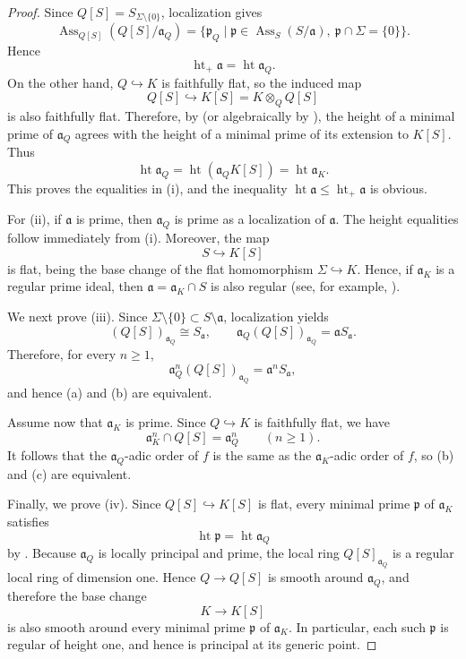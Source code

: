 \documentclass[a4paper]{amsart}
\renewcommand{\a}{{\mathfrak{a}}}
\theoremstyle{definition}
\begin{document}
\begin{proof}
Since $Q[S]=S_{\Sigma\setminus\{0\}}$, localization gives
\[
\operatorname{Ass}_{Q[S]}(Q[S]/\mathfrak a_Q)
=
\bigl\{
\mathfrak p_Q
\;\big|\;
\mathfrak p\in \operatorname{Ass}_S(S/\mathfrak a),\ 
\mathfrak p\cap\Sigma=\{0\}
\bigr\}.
\]
Hence
\[
\operatorname{ht}_+\mathfrak a=\operatorname{ht}\mathfrak a_Q.
\]
On the other hand, $Q\hookrightarrow K$ is faithfully flat, so the induced map
\[
Q[S]\hookrightarrow K[S]=K\otimes_Q Q[S]
\]
is also faithfully flat. Therefore, by \cite[III, Corollary 9.6]{ha}
(or algebraically by \cite[Theorem 15.1]{mats}),
the height of a minimal prime of $\mathfrak a_Q$ agrees with the height of a
minimal prime of its extension to $K[S]$. Thus
\[
\operatorname{ht}\mathfrak a_Q
=
\operatorname{ht}(\mathfrak a_QK[S])
=
\operatorname{ht}\mathfrak a_K.
\]
This proves the equalities in {\rm (i)}, and the inequality
$\operatorname{ht}\mathfrak a\le \operatorname{ht}_+\mathfrak a$ is obvious.

For {\rm (ii)}, if $\mathfrak a$ is prime, then $\mathfrak a_Q$ is prime as a
localization of $\mathfrak a$.
The height equalities follow immediately from {\rm (i)}.
Moreover, the map
\[
S\hookrightarrow K[S]
\]
is flat, being the base change of the flat homomorphism $\Sigma\hookrightarrow K$.
Hence, if $\a_K$ is a regular prime ideal, then
$\a=\a_K\cap S$ is also regular
(see, for example, \cite[Theorem 15.1(ii)]{mats}).

We next prove {\rm (iii)}.
Since $\Sigma\setminus\{0\}\subset S\setminus \a$, localization yields
\[
(Q[S])_{\mathfrak a_Q}\cong S_{\mathfrak a},
\qquad
\mathfrak a_Q (Q[S])_{\mathfrak a_Q}=\mathfrak a S_{\mathfrak a}.
\]
Therefore, for every $n\ge 1$,
\[
\mathfrak a_Q^n (Q[S])_{\mathfrak a_Q}
=
\mathfrak a^n S_{\mathfrak a},
\]
and hence {\rm (a)} and {\rm (b)} are equivalent.

Assume now that $\mathfrak a_K$ is prime.
Since $Q\hookrightarrow K$ is faithfully flat, we have
\[
\mathfrak a_K^n\cap Q[S]=\mathfrak a_Q^n
\qquad (n\ge 1).
\]
It follows that the $\mathfrak a_Q$-adic order of $f$ is the same as the
$\mathfrak a_K$-adic order of $f$, so {\rm (b)} and {\rm (c)} are equivalent.

Finally, we prove {\rm (iv)}.
Since $Q[S]\hookrightarrow K[S]$ is flat, every minimal prime $\mathfrak p$ of
$\mathfrak a_K$ satisfies
\[
\operatorname{ht}\mathfrak p=\operatorname{ht}\mathfrak a_Q
\]
by \cite[Theorem 15.1]{mats}.
Because $\mathfrak a_Q$ is locally principal and prime, the local ring
$Q[S]_{\mathfrak a_Q}$ is a regular local ring of dimension one.
Hence $Q\to Q[S]$ is smooth around $\mathfrak a_Q$, and therefore the base change
\[
K\to K[S]
\]
is also smooth around every minimal prime $\mathfrak p$ of $\mathfrak a_K$.
In particular, each such $\mathfrak p$ is regular of height one, and hence is
principal at its generic point.


\end{proof}
\end{document}
